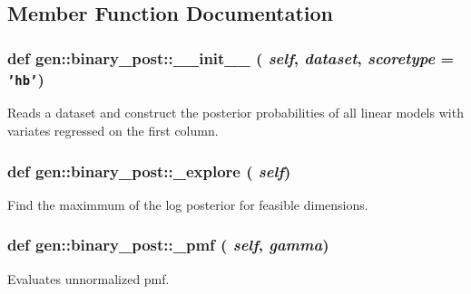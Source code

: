 \subsection{Member Function Documentation}
\hypertarget{classgen_1_1binary__post_7069c5816dfa311016a8ea94494ae99f}{
\subsubsection[{\_\-\_\-init\_\-\_\-}]{\setlength{\rightskip}{0pt plus 5cm}def gen::binary\_\-post::\_\-\_\-init\_\-\_\- ( {\em self}, \/   {\em dataset}, \/   {\em scoretype} = {\tt 'hb'})}}
\label{classgen_1_1binary__post_7069c5816dfa311016a8ea94494ae99f}


Reads a dataset and construct the posterior probabilities of all linear models with variates regressed on the first column. 

\hypertarget{classgen_1_1binary__post_fbfecb84772369428033234930e079a8}{
\subsubsection[{\_\-explore}]{\setlength{\rightskip}{0pt plus 5cm}def gen::binary\_\-post::\_\-explore ( {\em self})}}
\label{classgen_1_1binary__post_fbfecb84772369428033234930e079a8}


Find the maximmum of the log posterior for feasible dimensions. 

\hypertarget{classgen_1_1binary__post_a599045ffd56b46eced7ebae979781ff}{
\subsubsection[{\_\-pmf}]{\setlength{\rightskip}{0pt plus 5cm}def gen::binary\_\-post::\_\-pmf ( {\em self}, \/   {\em gamma})}}
\label{classgen_1_1binary__post_a599045ffd56b46eced7ebae979781ff}


Evaluates unnormalized pmf. 

